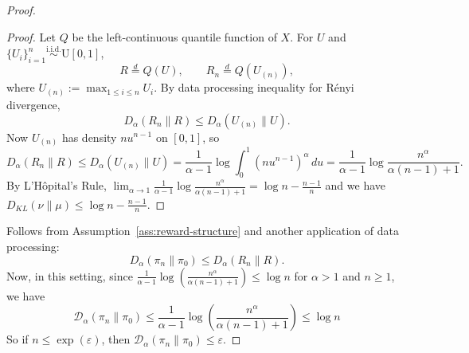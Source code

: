 \documentclass[11pt]{article}
\providecommand{\DD}{\mathcal{D}}
\providecommand{\paren}[1]{\left(#1\right)}
\providecommand{\iid}{\textrm{i.i.d.}}
\begin{document}
\begin{proof}
\begin{proof}
Let $Q$ be the left-continuous quantile function of $X$. For $U$ and $\{U_i\}_{i=1}^n \overset{\iid}{\sim}\mathrm{U}[0,1]$,
\[
R\stackrel{d}=Q(U),
\qquad
R_n\stackrel{d}=Q(U_{(n)}),
\]
where $U_{(n)}:=\max_{1\le i\le n}U_i$.
By data processing inequality for R\'enyi divergence,
\[
D_\alpha(R_n\|R)\le D_\alpha(U_{(n)}\|U).
\]
Now $U_{(n)}$ has density $n u^{n-1}$ on $[0,1]$, so
\[
D_\alpha(R_n\|R)\le D_\alpha(U_{(n)}\|U)
=
\frac{1}{\alpha-1}\log\int_0^1 \paren{n u^{n-1}}^\alpha\,du
=
\frac{1}{\alpha-1}\log\frac{n^\alpha}{\alpha(n-1)+1}.
\]
By L'Hôpital's Rule, $\lim_{\alpha \to 1}\frac{1}{\alpha-1}\log\frac{n^\alpha}{\alpha(n-1)+1}=\log n-\frac{n-1}{n}$ and we have $D_{KL}(\nu \| \mu) \leq \log n-\frac{n-1}{n}$.
\end{proof}

Follows from Assumption~\ref{ass:reward-structure} and another application of data processing:
\[
D_\alpha(\pi_n\|\pi_0)\le D_\alpha(R_n\|R).
\]
Now, in this setting, since $\frac{1}{\alpha-1}\log \left( \frac{n^\alpha}{\alpha(n-1)+1} \right)\leq \log n$ for $\alpha>1$ and $n\ge 1$, we have 
\[
\DD_\alpha(\pi_n \|\pi_0) \leq \frac{1}{\alpha-1}\log \left( \frac{n^\alpha}{\alpha(n-1)+1} \right)\leq \log n
\]
So if $n\leq \exp(\varepsilon)$, then $\DD_\alpha(\pi_n\|\pi_0)\leq \varepsilon$.


\end{proof}
\end{document}
